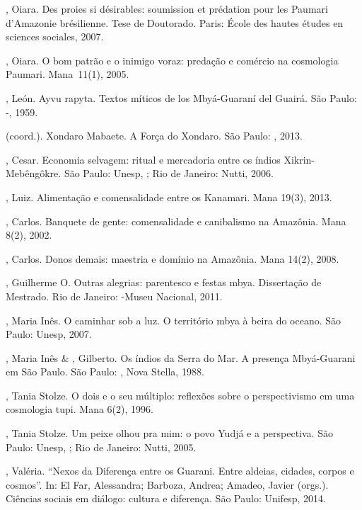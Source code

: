 \begin{Parskip}
, Oiara. Des proies si désirables: soumission et prédation pour
les Paumari d’Amazonie br\'{e}silienne. Tese de Doutorado.  Paris:
École des hautes études en sciences sociales, 2007.

, Oiara. O bom patrão e o inimigo voraz: predação e comércio na
cosmologia Paumari. Mana~11(1), 2005.

, León. Ayvu rapyta. Textos míticos de los Mbyá-Guaraní del
Guairá. São Paulo: -, 1959.

    (coord.). Xondaro Mabaete. A Força do
Xondaro. São Paulo: , 2013.

, Cesar. Economia selvagem: ritual e mercadoria entre os índios
Xikrin-Mebêngôkre. São Paulo: Unesp, ; Rio de Janeiro: Nutti, 2006.

, Luiz. Alimentação e comensalidade entre os Kanamari. Mana 19(3),
2013.

, Carlos. Banquete de gente: comensalidade e canibalismo na
Amazônia. Mana 8(2), 2002.

, Carlos. Donos demais: maestria e domínio na Amazônia. Mana
14(2), 2008.

, Guilherme O. Outras alegrias: parentesco e festas mbya.
Dissertação de Mestrado. Rio de Janeiro: -Museu Nacional, 2011.

, Maria Inês. O caminhar sob a luz. O território mbya à beira do
oceano. São Paulo: Unesp, 2007.

, Maria Inês \& , Gilberto. Os índios da Serra do Mar. A
presença Mbyá-Guarani em São Paulo. São Paulo: , Nova Stella, 1988.

, Tania Stolze. O dois e o seu múltiplo: reflexões sobre o
perspectivismo em uma cosmologia tupi. Mana 6(2), 1996.

, Tania Stolze. Um peixe olhou pra mim: o povo Yudjá e a
perspectiva. São Paulo: Unesp, ; Rio de Janeiro: Nutti, 2005.

, Valéria. ``Nexos da Diferença entre os Guarani. Entre aldeias,
cidades, corpos e cosmos''. In: El Far, Alessandra; Barboza, Andrea;
Amadeo, Javier (orgs.). Ciências sociais em diálogo: cultura e
diferença. São Paulo: Unifesp, 2014.


\end{Parskip}

